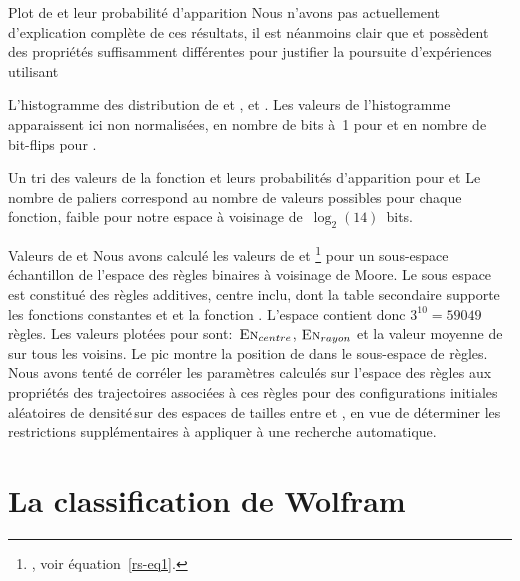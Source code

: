 %
{}%
{Plot de \protect\alambda et \protect\Flip \protect\vs leur probabilité d'apparition}%
{Nous n'avons pas actuellement d'explication complète de ces
  résultats, il est néanmoins clair que \alambda et \Flip possèdent des
  propriétés suffisamment différentes pour justifier la poursuite
  d'expériences utilisant \Flip} 

%
{}%
{L'histogramme des distribution de \protect\alambda et \protect\Flip, et
  \protect\alambda \protect\vs \protect\Flip.}%
{Les valeurs de l'histogramme apparaissent ici non normalisées, \ie en
  nombre de bits à~1 pour \alambda et en nombre de bit-flips pour
  \Flip.}

%
{}%
{Un tri des valeurs de la fonction et leurs probabilités d'apparition
  pour \protect\alambda et \protect\Flip}%
{Le nombre de paliers correspond au nombre de valeurs possibles pour
  chaque fonction, faible pour notre espace à voisinage
  de~$\log_{2}(14)$~bits.}

%
{}%
{Valeurs de \protect\alambda et \protect\En}%
{Nous avons calculé les valeurs de \alambda et \En{}\footnote{%
    , voir équation~\ref{rs-eq1}.} %
  pour un sous-espace échantillon de l'espace des règles binaires à
  voisinage de Moore. %
  Le sous espace est constitué des règles additives, centre inclu, dont la table
  secondaire supporte les fonctions constantes  et
   et la fonction . %
  L'espace contient donc $3^{10} = 59049$ règles. %
  Les valeurs plotées pour \En sont:~$\text{\textsc{En}}_{centre}$,
  $\text{\textsc{En}}_{rayon}$ et la valeur moyenne de \En sur tous les
  voisins. %
  Le pic montre la position de  dans le sous-espace de
  règles. %
  Nous avons tenté de corréler les paramètres calculés sur l'espace des
  règles aux propriétés des trajectoires associées à ces règles pour des
  configurations initiales aléatoires de densité\,\Sundemi sur des espaces
  de tailles entre  et , en vue de
  déterminer les restrictions supplémentaires à appliquer à une
  recherche automatique.}

\section{La classification de Wolfram}

